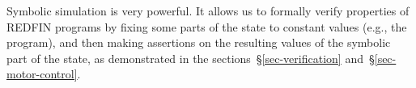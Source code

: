 Symbolic simulation is very powerful. It allows us to formally verify properties
of REDFIN programs by fixing some parts of the state to constant values (e.g.,
the program), and then making assertions on the resulting values of
the symbolic part of the state, as demonstrated in the
sections~\S\ref{sec-verification} and~\S\ref{sec-motor-control}.
